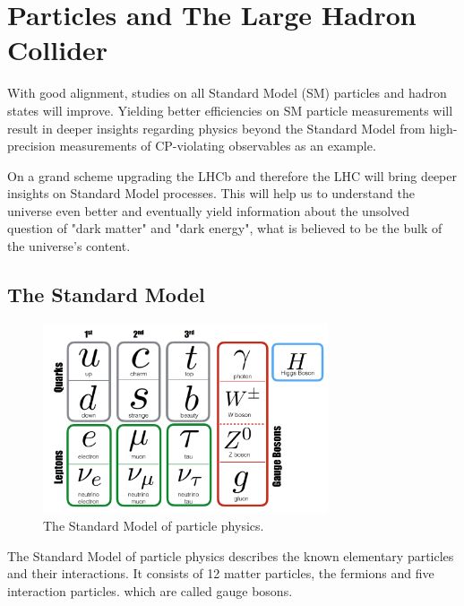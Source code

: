 \chapter{Particles and The Large Hadron Collider}
\label{sec:particleslhc}

With good alignment, studies on all Standard Model (SM) particles and hadron states
will improve. Yielding better efficiencies on SM particle measurements will
result in deeper insights regarding physics beyond the Standard Model from high-precision measurements of CP-violating observables as an example.

On a grand scheme upgrading the LHCb and therefore the LHC will bring deeper
insights on Standard Model processes. This will help us to understand the universe even better and eventually yield information about the unsolved question of "dark matter" and
"dark energy", what is believed to be the bulk of the universe's content.

\section{The Standard Model}
\label{sec:sm}

\begin{figure}
  \centering
  \includegraphics[width=0.75\textwidth]{plots/SM_2018.png}
  \caption{The Standard Model of particle physics\cite{standard2018}.}
  \label{fig:sm2018}
\end{figure}

The Standard Model of particle physics describes the known elementary particles and their interactions. It consists of 12 matter particles, the fermions
and five interaction particles. which are called gauge bosons.

